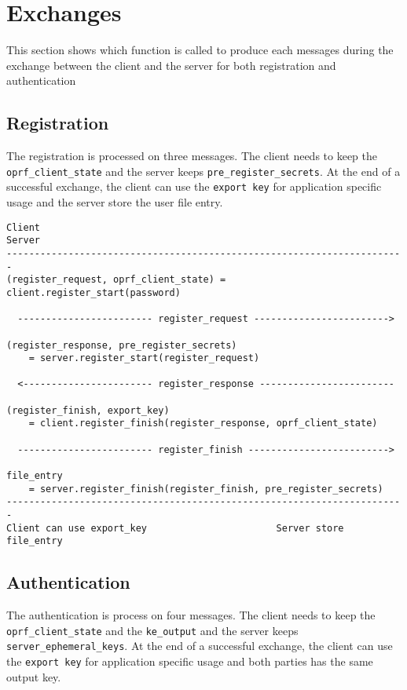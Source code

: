 \documentclass[../report.tex]{subfiles}
\begin{document}
\section{Exchanges}

This section shows which function is called to produce each messages during the exchange between the client and the server for both registration and authentication

\subsection{Registration}

The registration is processed on three messages. The client needs to keep the \verb|oprf_client_state| and the server keeps \verb|pre_register_secrets|. At the end of a successful exchange, the client can use the \verb|export key| for application specific usage and the server store the user file entry.

\begin{verbatim}
Client                                                           Server
-----------------------------------------------------------------------
(register_request, oprf_client_state) = client.register_start(password)

  ------------------------ register_request ------------------------>

(register_response, pre_register_secrets)
    = server.register_start(register_request)

  <----------------------- register_response ------------------------

(register_finish, export_key)
    = client.register_finish(register_response, oprf_client_state)

  ------------------------ register_finish ------------------------->

file_entry 
    = server.register_finish(register_finish, pre_register_secrets)
-----------------------------------------------------------------------
Client can use export_key                       Server store file_entry
\end{verbatim}

\subsection{Authentication}

The authentication is process on four messages.
The client needs to keep the \verb|oprf_client_state| and the \verb|ke_output| and the server keeps \verb|server_ephemeral_keys|. At the end of a successful exchange, the client can use the \verb|export key| for application specific usage and both parties has the same output key.
\end{document}
